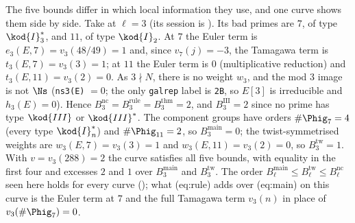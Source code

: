 \begin{sloppypar}
The five bounds differ in which local information they use, and one curve shows them side by side. Take  at $\ell=3$ (its
session is ). Its bad primes are $7$, of type $\kod{I}_3^*$, and $11$, of type $\kod{I}_2$. At $7$ the Euler term is
$e_3(E,7)=v_3(48/49)=1$ and, since $v_7(j)=-3$, the Tamagawa term is $t_3(E,7)=v_3(3)=1$; at $11$ the Euler term is $0$ (multiplicative reduction) and
$t_3(E,11)=v_3(2)=0$. As $3\nmid N$, there is no weight $w_3$, and the mod $3$ image is not $\Ns$ (\texttt{ns3(E)} $=0$; the only \texttt{galrep} label is
\texttt{2B}, so $E[3]$ is irreducible and $h_3(E)=0$). Hence $B^{\mathrm{nc}}_3=B^{\mathrm{rule}}_3=B^{\mathrm{thm}}_3=2$, and $B^{\mathrm{III}}_3=2$ since no prime
has type $\kod{III}$ or $\kod{III}^*$. The component groups have orders $\#\Phig_7=4$ (every type $\kod{I}_n^*$) and $\#\Phig_{11}=2$, so $B^{\mathrm{main}}_3=0$; the
twist-symmetrised weights are $w_3(E,7)=v_3(3)=1$ and $w_3(E,11)=v_3(2)=0$, so $B^{\mathrm{tw}}_3=1$. With $v=v_3(288)=2$ the curve satisfies all five
bounds, with equality in the first four and excesses $2$ and $1$ over $B^{\mathrm{main}}_3$ and $B^{\mathrm{tw}}_3$. The order
$B^{\mathrm{main}}_\ell\le B^{\mathrm{tw}}_\ell\le B^{\mathrm{nc}}_\ell$ seen here holds for every curve (); what (eq:rule) adds
over (eq:main) on this curve is the Euler term at $7$ and the full Tamagawa term $v_3(n)$ in place of $v_3(\#\Phig_7)=0$.


\end{sloppypar}
